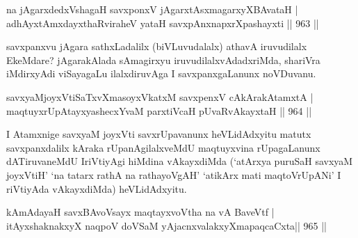 
\begin{shl}
na jAgarxdedxVshagaH savxponxV jAgarxtAsxmagarxyXBAvataH | \\
adhAyxtAmxdayxthaRviraheV yataH savxpAnxnapxrXpashayxti \hfill ||  963 ||  
\end{shl}

\begin{artha}
savxpanxvu jAgara sathxLadalilx (biVLuvudalalx) athavA iruvudilalx EkeMdare? jAgarakAlada sAmagirxyu iruvudilalxvAdadxriMda, shariVra iMdirxyAdi viSayagaLu ilalxdiruvAga I savxpanxgaLanunx noVDuvanu.
\end{artha}


\begin{shl}
savxyaMjoyxVtiSaTxvXmasoyxVkatxM savxpenxV cAkArakAtamxtA | \\
maqtuyxrUpAtayxyashecxYvaM parxtiVcaH pUvaRvAkayxtaH \hfill||  964 ||  
\end{shl}

\begin{artha}
I Atamxnige savxyaM joyxVti savxrUpavanunx heVLidAdxyitu matutx savxpanxdalilx kAraka rUpanAgilalxveMdU maqtuyxvina rUpagaLanunx dATiruvaneMdU IriVtiyAgi hiMdina vAkayxdiMda (`atArxya puruSaH savxyaM joyxVtiH' `na tatarx rathA na rathayoVgAH' `atikArx mati maqtoVrUpANi' I riVtiyAda vAkayxdiMda) heVLidAdxyitu.
\end{artha}


\begin{shl}
\footnotemark[1]kAmAdayaH savxBAvoV\s sayx maqtayxvoV\s tha na vA BaveVtf | \\
itAyxshaknakxyX naqpoV doVSaM yAjacnxvalakxyXmapaqcaCxta\hfill ||  965 ||  
\end{shl}

